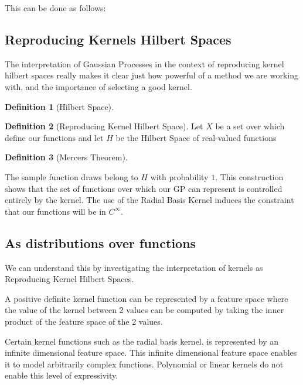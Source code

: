 \documentclass[12pt, a4paper]{report}
\theoremstyle{definition}
\theoremstyle{definition}
\newtheorem{definition}{Definition}[section]
\theoremstyle{definition}
\begin{document}
This can be done as follows: 

\subsection{Reproducing Kernels Hilbert Spaces}

The interpretation of Gaussian Processes in the context of reproducing kernel hilbert spaces really makes it clear just how powerful of a method we are working with, and the importance of selecting a good kernel.


\begin{definition}[Hilbert Space]
    
\end{definition}

\begin{definition}[Reproducing Kernel Hilbert Space]
    Let $X$ be a set over which define our functions and let $H$ be the Hilbert Space of real-valued functions 
\end{definition}

\begin{definition}[Mercers Theorem]
    
\end{definition}


The sample function draws belong to $H$ with probability $1$. This construction shows that the set of functions over which our GP can represent is controlled entirely by the kernel. The use of the Radial Basis Kernel induces the constraint that our functions will be in $C^\infty$.



\subsection{As distributions over functions}


We can understand this by investigating the interpretation of kernels as Reproducing Kernel Hilbert Spaces.



A positive definite kernel function can be represented by a feature space where the value of the kernel between 2 values can be computed by taking the inner product of the feature space of the 2 values.

Certain kernel functions such as the radial basis kernel, is represented by an infinite dimensional feature space. This infinite dimensional feature space enables it to model arbitrarily complex functions. Polynomial or linear kernels do not enable this level of expressivity.
\end{document}
